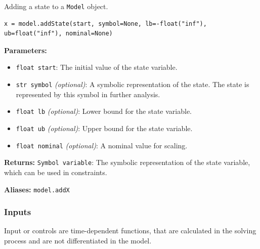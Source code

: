 \documentclass[12pt]{article}
\begin{document}
\begin{mdframed}[backgroundcolor=gray!10, roundcorner=10pt, linewidth=1pt]

	Adding a state to a \texttt{Model} object.

	\begin{lstlisting}
x = model.addState(start, symbol=None, lb=-float("inf"), ub=float("inf"), nominal=None)
	\end{lstlisting}\label{addState}

	\textbf{Parameters:}
	\begin{itemize}
		\item \texttt{float start}: The initial value of the state
		      variable.
		\item \texttt{str symbol} \emph{(optional)}: A symbolic
		      representation of the state. The state is
		      represented by this symbol in
		      further analysis.
		\item \texttt{float lb} \emph{(optional)}: Lower bound for the
		      state variable.
		\item \texttt{float ub} \emph{(optional)}: Upper bound for the
		      state variable.
		\item \texttt{float nominal} \emph{(optional)}: A nominal value
		      for scaling.
	\end{itemize}

	\textbf{Returns:}
	\texttt{Symbol variable}: The symbolic representation of the state
	variable, which can be used in constraints.

	\textbf{Aliases:} \texttt{model.addX}
\end{mdframed}

\subsubsection{Inputs}

Input or controls are time-dependent functions, that are calculated in the
solving process and are not differentiated in the model.
\end{document}

